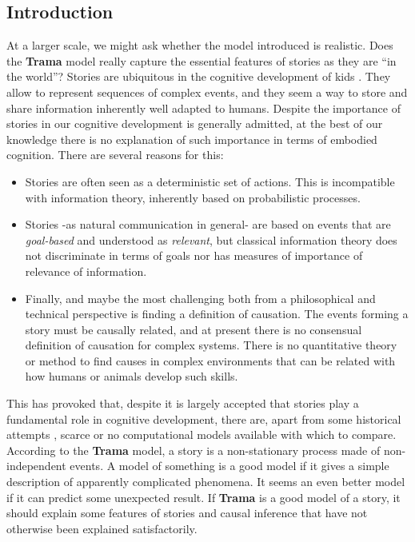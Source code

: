 \documentclass[
		twoside,openright,titlepage,numbers=noenddot,manychapters,
		headinclude,%
                footinclude=false,cleardoublepage=empty,
                BCOR=5mm,
		fontsize=11pt, %
                 enabledeprecatedfontcommands]{scrreprt}
\begin{document}
\subsection{Introduction}
At a larger scale, we might ask whether the model introduced is realistic. Does the \textbf{Trama} model really capture the essential features of stories as they are ``in the world''? Stories are ubiquitous in the cognitive development of kids \cite[pages 128-208]{boyd2009origin}. They allow to represent sequences of complex events, and they seem a way to store and share information inherently well adapted to humans. Despite the importance of stories in our cognitive development is generally admitted, at the best of our knowledge there is no explanation of such importance in terms of embodied cognition. There are several reasons for this:
\begin{itemize}
\item Stories are often seen as a deterministic set of actions. This is incompatible with information theory, inherently based on probabilistic processes.
\item Stories -as natural communication in general- are based on events that are \emph{goal-based} and understood as \emph{relevant}, but classical information theory does not discriminate in terms of goals nor has measures of importance of relevance of information. 
\item  Finally, and maybe the most challenging both from a philosophical and technical perspective is finding a definition of causation. The events forming a story must be causally related, and at present there is no consensual definition of causation for complex systems. There is no quantitative theory or method to find causes in complex environments that can be related with how humans or animals develop such skills.
\end{itemize}
This has provoked that, despite it is largely accepted that stories play a fundamental role in cognitive development, there are, apart from some historical attempts \cite[]{schank1977}, scarce or no computational models available with which to compare. According to the \textbf{Trama} model, a story is a non-stationary process made of non-independent events. A model of something is a good model if it gives a simple description of apparently complicated phenomena. It seems an even better model if it can predict some unexpected result.  If \textbf{Trama} is a good model of a story, it should explain some features of stories and causal inference that have not otherwise been explained satisfactorily.
\end{document}
